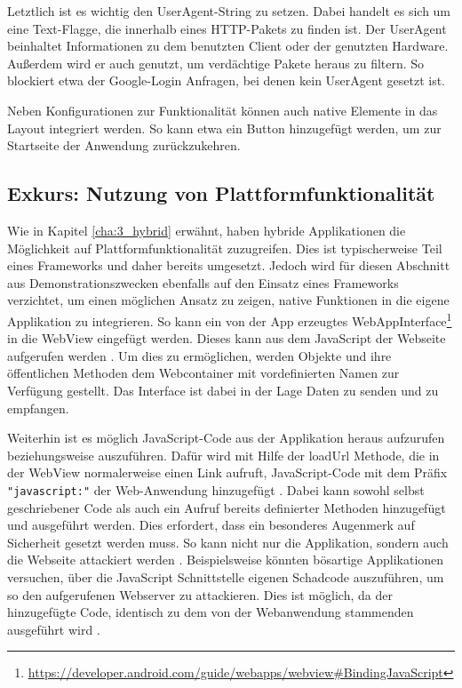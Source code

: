 Letztlich ist es wichtig den UserAgent-String zu setzen. Dabei handelt es sich um eine Text-Flagge, die innerhalb eines HTTP-Pakets zu finden ist. Der UserAgent beinhaltet Informationen zu dem benutzten Client oder der genutzten Hardware. Außerdem wird er auch genutzt, um verdächtige Pakete heraus zu filtern\cite{UserAgentString}. So blockiert etwa der Google-Login Anfragen, bei denen kein UserAgent gesetzt ist.

Neben Konfigurationen zur Funktionalität können auch native Elemente in das Layout integriert werden. So kann etwa ein Button hinzugefügt werden, um zur Startseite der Anwendung zurückzukehren.
\\
\subsection{Exkurs: Nutzung von Plattformfunktionalität}
Wie in Kapitel \ref{cha:3_hybrid} erwähnt, haben hybride Applikationen die Möglichkeit auf Plattformfunktionalität zuzugreifen. 
Dies ist typischerweise Teil eines Frameworks und daher bereits umgesetzt.
Jedoch wird für diesen Abschnitt aus Demonstrationszwecken ebenfalls auf den Einsatz eines Frameworks verzichtet, um einen möglichen Ansatz zu zeigen, native Funktionen in die eigene Applikation zu integrieren. So kann ein von der App erzeugtes WebAppInterface\footnote{\url{https://developer.android.com/guide/webapps/webview\#BindingJavaScript}} in die WebView eingefügt werden. Dieses kann aus dem JavaScript der Webseite aufgerufen werden \cite{webview_javascript_security}. Um dies zu ermöglichen, werden Objekte und ihre öffentlichen Methoden dem Webcontainer mit vordefinierten Namen zur Verfügung gestellt. Das Interface ist dabei in der Lage Daten zu senden und zu empfangen.

Weiterhin ist es möglich JavaScript-Code aus der Applikation heraus aufzurufen beziehungsweise auszuführen. Dafür wird mit Hilfe der loadUrl Methode, die in der WebView normalerweise einen Link aufruft, JavaScript-Code mit dem Präfix \verb|"javascript:"| der Web-Anwendung hinzugefügt \cite{webview_javascript_security}.
Dabei kann sowohl selbst geschriebener Code als auch ein Aufruf bereits definierter Methoden hinzugefügt und ausgeführt werden.
Dies erfordert, dass ein besonderes Augenmerk auf Sicherheit gesetzt werden muss. So kann nicht nur die Applikation, sondern auch die Webseite attackiert werden \cite{webview_javascript_security}. 
Beispielsweise könnten bösartige Applikationen versuchen, über die JavaScript Schnittstelle eigenen Schadcode auszuführen, um so den aufgerufenen Webserver zu attackieren. Dies ist möglich, da der hinzugefügte Code, identisch zu dem von der Webanwendung stammenden ausgeführt wird \cite{webview_javascript_security}.

